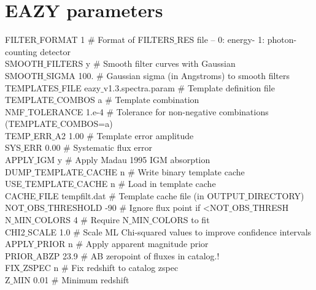 \section{EAZY parameters}
\label{sec:eazy}
\begin{tt}
FILTER$\_$FORMAT        1                  $\#$ Format of FILTERS$\_$RES file -- 0: energy-  1: photon-counting detector\\
SMOOTH$\_$FILTERS       y                  $\#$ Smooth filter curves with Gaussian\\
SMOOTH$\_$SIGMA         100.               $\#$ Gaussian sigma (in Angstroms) to smooth filters\\
TEMPLATES$\_$FILE       eazy$\_$v1.3.spectra.param $\#$ Template definition file\\
TEMPLATE$\_$COMBOS      a                  $\#$ Template combination \\
NMF$\_$TOLERANCE        1.e-4              $\#$ Tolerance for non-negative combinations (TEMPLATE$\_$COMBOS=a)\\
TEMP$\_$ERR$\_$A2          1.00               $\#$ Template error amplitude\\
SYS$\_$ERR              0.00               $\#$ Systematic flux error\\
APPLY$\_$IGM            y                  $\#$ Apply Madau 1995 IGM absorption\\
DUMP$\_$TEMPLATE$\_$CACHE  n                  $\#$ Write binary template cache\\
USE$\_$TEMPLATE$\_$CACHE   n                  $\#$ Load in template cache\\
CACHE$\_$FILE           tempfilt.dat       $\#$ Template cache file (in OUTPUT$\_$DIRECTORY)\\
NOT$\_$OBS$\_$THRESHOLD    -90                $\#$ Ignore flux point if <NOT$\_$OBS$\_$THRESH\\
N$\_$MIN$\_$COLORS         4                  $\#$ Require N$\_$MIN$\_$COLORS to fit\\
CHI2$\_$SCALE           1.0                $\#$ Scale ML Chi-squared values to improve confidence intervals\\
APPLY$\_$PRIOR          n                  $\#$ Apply apparent magnitude prior\\
PRIOR$\_$ABZP           23.9               $\#$ AB zeropoint of fluxes in catalog.!\\
FIX$\_$ZSPEC            n                  $\#$ Fix redshift to catalog zspec\\
Z$\_$MIN                0.01               $\#$ Minimum redshift\\

\end{tt}
